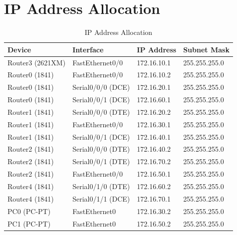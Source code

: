 \documentclass[12pt, a4paper]{report}
\begin{document}
\section*{IP Address Allocation}
\begin{table}[H]
	\centering
	\begin{tabular}{|l|l|l|l|}
		\hline
		\textbf{Device} & \textbf{Interface} & \textbf{IP Address} & \textbf{Subnet Mask} \\ \hline
		Router3 (2621XM) & FastEthernet0/0   & 172.16.10.1 & 255.255.255.0 \\ \hline
		Router0 (1841)   & FastEthernet0/0   & 172.16.10.2 & 255.255.255.0 \\ \hline
		Router0 (1841)   & Serial0/0/0 (DCE) & 172.16.20.1 & 255.255.255.0 \\ \hline
		Router0 (1841)   & Serial0/0/1 (DCE) & 172.16.60.1 & 255.255.255.0 \\ \hline
		Router1 (1841)   & Serial0/0/0 (DTE) & 172.16.20.2 & 255.255.255.0 \\ \hline
		Router1 (1841)   & FastEthernet0/0   & 172.16.30.1 & 255.255.255.0 \\ \hline
		Router1 (1841)   & Serial0/0/1 (DCE) & 172.16.40.1 & 255.255.255.0 \\ \hline
		Router2 (1841)   & Serial0/0/0 (DTE) & 172.16.40.2 & 255.255.255.0 \\ \hline
		Router2 (1841)   & Serial0/0/1 (DTE) & 172.16.70.2 & 255.255.255.0 \\ \hline
		Router2 (1841)   & FastEthernet0/0   & 172.16.50.1 & 255.255.255.0 \\ \hline
		Router4 (1841)   & Serial0/1/0 (DTE) & 172.16.60.2 & 255.255.255.0 \\ \hline
		Router4 (1841)   & Serial0/1/1 (DCE) & 172.16.70.1 & 255.255.255.0 \\ \hline
		PC0 (PC-PT)      & FastEthernet0     & 172.16.30.2 & 255.255.255.0 \\ \hline
		PC1 (PC-PT)      & FastEthernet0     & 172.16.50.2 & 255.255.255.0 \\ \hline
	\end{tabular}
	\caption{IP Address Allocation}
\end{table}
\end{document}
